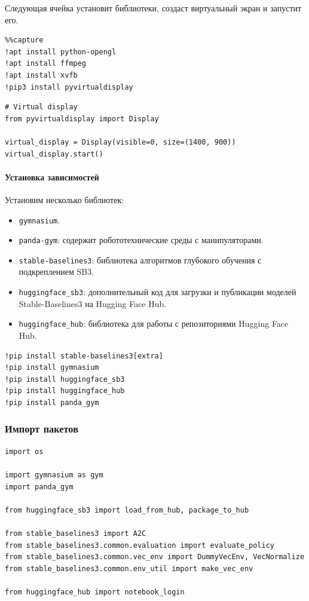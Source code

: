 \documentclass[11pt,a4paper]{article}
\begin{document}
Следующая ячейка установит библиотеки, создаст виртуальный экран и запустит его.

\begin{lstlisting}
%%capture
!apt install python-opengl
!apt install ffmpeg
!apt install xvfb
!pip3 install pyvirtualdisplay
\end{lstlisting}

\begin{lstlisting}
# Virtual display
from pyvirtualdisplay import Display

virtual_display = Display(visible=0, size=(1400, 900))
virtual_display.start()
\end{lstlisting}

\paragraph{Установка зависимостей}\label{install-dependencies}

Установим несколько библиотек:

\begin{itemize}
\tightlist
\item
  \texttt{gymnasium}.
\item
  \texttt{panda-gym}: содержит робототехнические среды с манипуляторами.
\item
  \texttt{stable-baselines3}: библиотека алгоритмов глубокого обучения с подкреплением SB3.
\item
  \texttt{huggingface\_sb3}: дополнительный код для загрузки и публикации моделей Stable-Baselines3 на Hugging Face Hub.
\item
  \texttt{huggingface\_hub}: библиотека для работы с репозиториями Hugging Face Hub.
\end{itemize}

\begin{lstlisting}
!pip install stable-baselines3[extra]
!pip install gymnasium
!pip install huggingface_sb3
!pip install huggingface_hub
!pip install panda_gym
\end{lstlisting}

\subsubsection{Импорт пакетов}\label{import-the-packages}

\begin{lstlisting}
import os

import gymnasium as gym
import panda_gym

from huggingface_sb3 import load_from_hub, package_to_hub

from stable_baselines3 import A2C
from stable_baselines3.common.evaluation import evaluate_policy
from stable_baselines3.common.vec_env import DummyVecEnv, VecNormalize
from stable_baselines3.common.env_util import make_vec_env

from huggingface_hub import notebook_login
\end{lstlisting}
\end{document}
